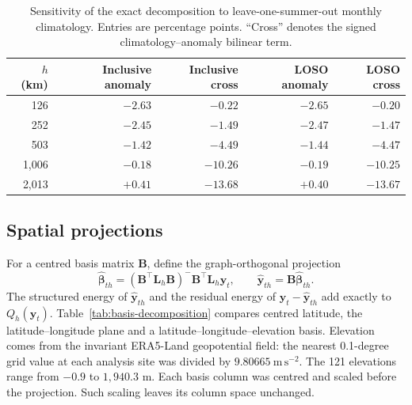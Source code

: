 \documentclass[namedate,webpdf,modern,mediumone]{oup-authoring-template}
\theoremstyle{thmstyleone}
\begin{document}
\begin{table}[htbp]
\centering
\caption{Sensitivity of the exact decomposition to leave-one-summer-out
monthly climatology. Entries are percentage points. ``Cross'' denotes the
signed climatology--anomaly bilinear term.}
\label{tab:loso-decomposition}
\small
\setlength{\tabcolsep}{6pt}
\begin{tabular}{rrrrr}
\toprule
$h$ (km) & Inclusive anomaly & Inclusive cross & LOSO anomaly & LOSO cross \\
\midrule
126   & $-2.63$ & $-0.22$  & $-2.65$ & $-0.20$ \\
252   & $-2.45$ & $-1.49$  & $-2.47$ & $-1.47$ \\
503   & $-1.42$ & $-4.49$  & $-1.44$ & $-4.47$ \\
1,006 & $-0.18$ & $-10.26$ & $-0.19$ & $-10.25$ \\
2,013 & $+0.41$ & $-13.68$ & $+0.40$ & $-13.67$ \\
\bottomrule
\end{tabular}
\end{table}

\subsection{Spatial projections}

For a centred basis matrix $\mathbf B$, define the graph-orthogonal projection
\[
 \widehat{\boldsymbol\beta}_{th}
 =(\mathbf B^\top\mathbf L_h\mathbf B)^{-}
   \mathbf B^\top\mathbf L_h\mathbf y_t,
 \qquad
 \widehat{\mathbf y}_{th}=\mathbf B\widehat{\boldsymbol\beta}_{th}.
\]
The structured energy of $\widehat{\mathbf y}_{th}$ and the residual energy
of $\mathbf y_t-\widehat{\mathbf y}_{th}$ add exactly to $Q_h(\mathbf y_t)$.
Table~\ref{tab:basis-decomposition} compares centred latitude, the
latitude--longitude plane and a latitude--longitude--elevation basis. Elevation
comes from the invariant ERA5-Land geopotential field: the nearest 0.1-degree
grid value at each analysis site was divided by
$9.80665\ \mathrm{m\,s^{-2}}$. The 121 elevations range from
$-0.9$ to $1{,}940.3$ m. Each basis column was centred and scaled before the
projection. Such scaling leaves its column space unchanged.
\end{document}
